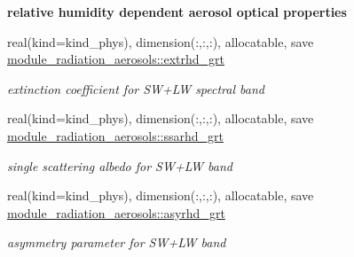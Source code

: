 \begin{Indent}\textbf{ relative humidity dependent aerosol optical properties}\par
\begin{DoxyCompactItemize}
\item 
real(kind=kind\+\_\+phys), dimension(\+:,\+:,\+:), allocatable, save \hyperlink{group__module__radiation__aerosols_ga07bfe1ada075519d1d3ceabe21b65a96}{module\+\_\+radiation\+\_\+aerosols\+::extrhd\+\_\+grt}
\begin{DoxyCompactList}\small\item\em extinction coefficient for S\+W+\+LW spectral band \end{DoxyCompactList}\item 
real(kind=kind\+\_\+phys), dimension(\+:,\+:,\+:), allocatable, save \hyperlink{group__module__radiation__aerosols_ga4aa91ab1d0b9d71c704dc565ef4704bf}{module\+\_\+radiation\+\_\+aerosols\+::ssarhd\+\_\+grt}
\begin{DoxyCompactList}\small\item\em single scattering albedo for S\+W+\+LW band \end{DoxyCompactList}\item 
real(kind=kind\+\_\+phys), dimension(\+:,\+:,\+:), allocatable, save \hyperlink{group__module__radiation__aerosols_ga2da45b8bd425415ca417f6590cc54da6}{module\+\_\+radiation\+\_\+aerosols\+::asyrhd\+\_\+grt}
\begin{DoxyCompactList}\small\item\em asymmetry parameter for S\+W+\+LW band \end{DoxyCompactList}\end{DoxyCompactItemize}
\end{Indent}
